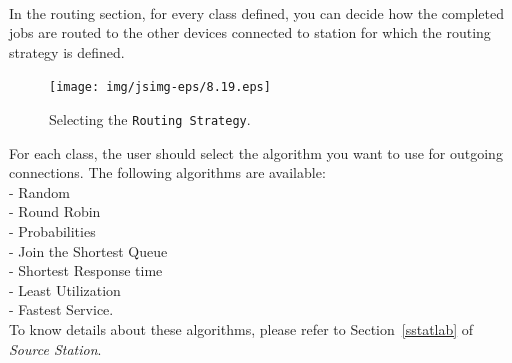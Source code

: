 \\ In the routing section, for
every class defined, you can decide how the completed jobs are
routed to the other devices connected to station for which the
routing strategy is defined.
\begin{figure}[htb]
    \begin{center}
        \texttt{[image: img/jsimg-eps/8.19.eps]}
    \end{center}
    \caption{Selecting the \texttt{Routing Strategy}.}
    \label{fig:selroutstrate}
\end{figure}
For each class, the user should select the algorithm you want to
use for outgoing connections. The following algorithms are available:\\
- Random\\ - Round Robin\\ - Probabilities\\ - Join the Shortest Queue\\
- Shortest Response time\\ - Least Utilization\\ - Fastest Service.\\
To know details about these algorithms, please refer to
Section~\ref{sstatlab} of \emph{Source Station}.

